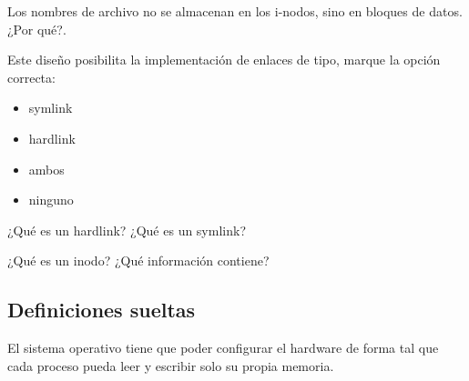 \documentclass[../main.tex]{subfiles}
\begin{document}
    \begin{exercise}
        Los nombres de archivo no se almacenan en los i-nodos, sino en bloques de datos. ¿Por qué?.

        Este diseño posibilita la implementación de enlaces de tipo, marque la opción correcta:
        \begin{itemize}
            \item symlink
            \item hardlink
            \item ambos 
            \item ninguno
        \end{itemize}
    \end{exercise}

    \begin{exercise}
        ¿Qué es un hardlink? ¿Qué es un symlink?
    \end{exercise}

    \begin{exercise}
        ¿Qué es un inodo? ¿Qué información contiene?
    \end{exercise}

\subsection{Definiciones sueltas}
    El sistema operativo tiene que poder configurar el hardware de forma tal que cada proceso pueda leer y escribir solo su propia memoria.
\end{document}
